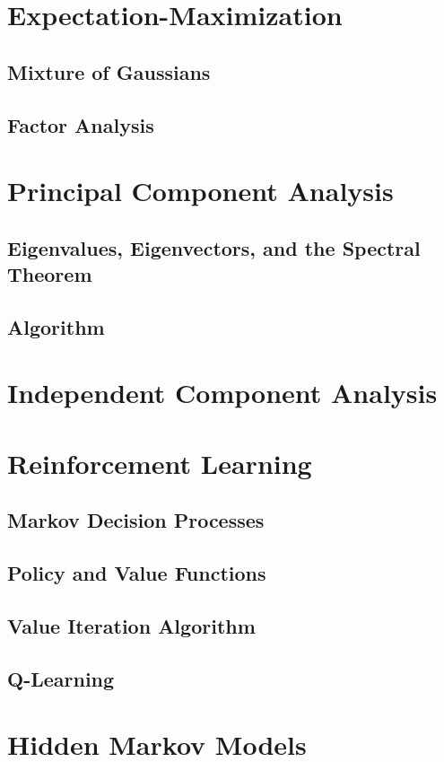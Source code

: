 \documentclass[twoside,twocolumn]{article}
\begin{document}
\section{Expectation-Maximization}
\subsection{Mixture of Gaussians}
\subsection{Factor Analysis}
\section{Principal Component Analysis}
\subsection{Eigenvalues, Eigenvectors, and the Spectral Theorem}
\subsection{Algorithm}
\section{Independent Component Analysis}
\section{Reinforcement Learning}
\subsection{Markov Decision Processes}
\subsection{Policy and Value Functions}
\subsection{Value Iteration Algorithm}
\subsection{Q-Learning}
\section{Hidden Markov Models}
\end{document}
